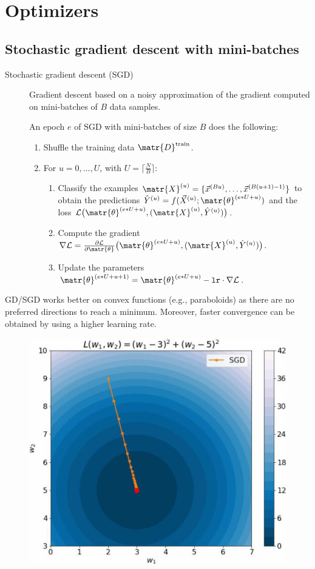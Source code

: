 \chapter{Optimizers}



\section{Stochastic gradient descent with mini-batches}

\begin{description}
    \item[Stochastic gradient descent (SGD)] 
        Gradient descent based on a noisy approximation of the gradient computed on mini-batches of $B$ data samples.

        An epoch $e$ of SGD with mini-batches of size $B$ does the following:
        \begin{enumerate}
            \item Shuffle the training data $\matr{D}^\text{train}$.
            \item For $u = 0, \dots, U$, with $U = \lceil \frac{N}{B} \rceil$:
            \begin{enumerate}
                \item Classify the examples $\matr{X}^{(u)} = \{ \vec{x}^{(Bu)}, \dots, \vec{x}^{(B(u+1)-1)} \}$ 
                    to obtain the predictions $\hat{Y}^{(u)} = f(\vec{X}^{(u)}; \matr{\theta}^{(e*U+u)})$
                    and the loss $\mathcal{L}\big( \matr{\theta}^{(e*U+u)}, (\matr{X}^{(u)}, \hat{Y}^{(u)}) \big)$.
                \item Compute the gradient $\nabla \mathcal{L} = \frac{\partial\mathcal{L}}{\partial \matr{\theta}}\big( \matr{\theta}^{(e*U+u)}, (\matr{X}^{(u)}, \hat{Y}^{(u)}) \big)$.
                \item Update the parameters $\matr{\theta}^{(e*U+u+1)} = \matr{\theta}^{(e*U+u)} - \texttt{lr} \cdot \nabla \mathcal{L}$.
            \end{enumerate}
        \end{enumerate}
\end{description}

\begin{remark}[Spheres] 
    GD/SGD works better on convex functions (e.g., paraboloids) as there are no preferred directions to reach a minimum. Moreover, faster convergence can be obtained by using a higher learning rate.

    \begin{figure}[H]
        \centering
        \includegraphics[width=0.35\linewidth]{./img/sgd_sphere.png}
    \end{figure}
\end{remark}

